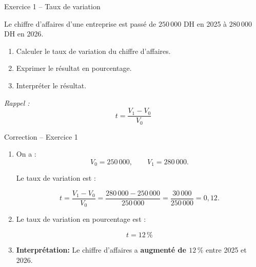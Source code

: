 \documentclass[aspectratio=169,11pt]{beamer}
\begin{document}
\begin{frame}{Exercice 1 -- Taux de variation}
	
	Le chiffre d'affaires d'une entreprise est passé de
	$250\,000$ DH en 2025 à $280\,000$ DH en 2026.
	
	\begin{enumerate}
		\item Calculer le taux de variation du chiffre d'affaires.
		\item Exprimer le résultat en pourcentage.
		\item Interpréter le résultat.
	\end{enumerate}
	
	\vfill
	
	\begin{center}
		\textit{Rappel :}\qquad
		\[
		t=\frac{V_1-V_0}{V_0}
		\]
	\end{center}
	
\end{frame}

\begin{frame}{Correction -- Exercice 1}
	\begin{enumerate}
		
		\item On a :
		\[
		V_0=250\,000,
		\qquad
		V_1=280\,000.
		\]
		
		Le taux de variation est :
		
		\[
		t=\frac{V_1-V_0}{V_0}
		=\frac{280\,000-250\,000}{250\,000}
		=\frac{30\,000}{250\,000}
		=0{,}12.
		\]
		
		\item Le taux de variation en pourcentage est :
		
		\[
		\boxed{t=12\,\%}
		\]
		
		\item  \textbf{Interprétation: }Le chiffre d'affaires a \textbf{augmenté de $12\,\%$}
		entre 2025 et 2026.
		
	\end{enumerate}
	
\end{frame}
\end{document}
